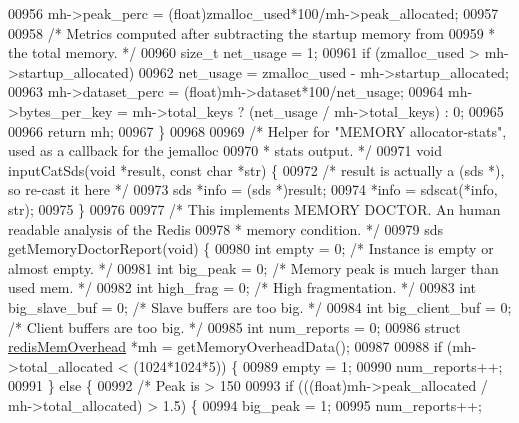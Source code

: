 \begin{DoxyCode}
{00956     mh->peak\_perc = (\textcolor{keywordtype}{float})zmalloc\_used*100/mh->peak\_allocated;
00957 
00958     \textcolor{comment}{/* Metrics computed after subtracting the startup memory from}
00959 \textcolor{comment}{     * the total memory. */}
00960     size\_t net\_usage = 1;
00961     \textcolor{keywordflow}{if} (zmalloc\_used > mh->startup\_allocated)
00962         net\_usage = zmalloc\_used - mh->startup\_allocated;
00963     mh->dataset\_perc = (\textcolor{keywordtype}{float})mh->dataset*100/net\_usage;
00964     mh->bytes\_per\_key = mh->total\_keys ? (net\_usage / mh->total\_keys) : 0;
00965 
00966     \textcolor{keywordflow}{return} mh;
00967 \}
00968 
00969 \textcolor{comment}{/* Helper for "MEMORY allocator-stats", used as a callback for the jemalloc}
00970 \textcolor{comment}{ * stats output. */}
00971 \textcolor{keywordtype}{void} inputCatSds(\textcolor{keywordtype}{void} *result, \textcolor{keyword}{const} \textcolor{keywordtype}{char} *str) \{
00972     \textcolor{comment}{/* result is actually a (sds *), so re-cast it here */}
00973     sds *info = (sds *)result;
00974     *info = sdscat(*info, str);
00975 \}
00976 
00977 \textcolor{comment}{/* This implements MEMORY DOCTOR. An human readable analysis of the Redis}
00978 \textcolor{comment}{ * memory condition. */}
00979 sds getMemoryDoctorReport(\textcolor{keywordtype}{void}) \{
00980     \textcolor{keywordtype}{int} empty = 0;          \textcolor{comment}{/* Instance is empty or almost empty. */}
00981     \textcolor{keywordtype}{int} big\_peak = 0;       \textcolor{comment}{/* Memory peak is much larger than used mem. */}
00982     \textcolor{keywordtype}{int} high\_frag = 0;      \textcolor{comment}{/* High fragmentation. */}
00983     \textcolor{keywordtype}{int} big\_slave\_buf = 0;  \textcolor{comment}{/* Slave buffers are too big. */}
00984     \textcolor{keywordtype}{int} big\_client\_buf = 0; \textcolor{comment}{/* Client buffers are too big. */}
00985     \textcolor{keywordtype}{int} num\_reports = 0;
00986     \textcolor{keyword}{struct} \hyperlink{structredisMemOverhead}{redisMemOverhead} *mh = getMemoryOverheadData();
00987 
00988     \textcolor{keywordflow}{if} (mh->total\_allocated < (1024*1024*5)) \{
00989         empty = 1;
00990         num\_reports++;
00991     \} \textcolor{keywordflow}{else} \{
00992         \textcolor{comment}{/* Peak is > 150%
00993         \textcolor{keywordflow}{if} (((\textcolor{keywordtype}{float})mh->peak\_allocated / mh->total\_allocated) > 1.5) \{
00994             big\_peak = 1;
00995             num\_reports++;
}}
\end{DoxyCode}
